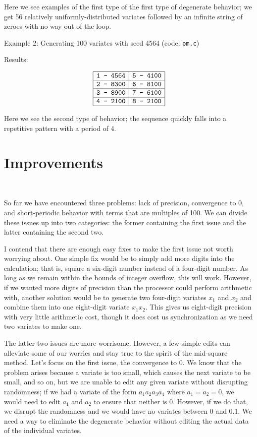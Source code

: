 \documentclass[11pt]{article}
\begin{document}
Here we see examples of the first type of the first type of degenerate behavior; we get 56 relatively uniformly-distributed variates followed by an infinite string of zeroes with no way out of the loop.

\vspace{1cm}

Example 2: Generating 100 variates with seed 4564 (code: \texttt{om.c})

Results:

$$\begin{array}{|c|c|}\hline
\texttt{1 - 4564} & \texttt{5 - 4100}\\\hline
\texttt{2 - 8300} & \texttt{6 - 8100}\\\hline
\texttt{3 - 8900} & \texttt{7 - 6100}\\\hline
\texttt{4 - 2100} & \texttt{8 - 2100}\\\hline
\end{array}$$

Here we see the second type of behavior; the sequence quickly falls into a repetitive pattern with a period of 4.

\newpage
\section{Improvements}

$ $

So far we have encountered three problems: lack of precision, convergence to 0, and short-periodic behavior with terms that are multiples of 100.  We can divide these issues up into two categories: the former containing the first issue and the latter containing the second two.

I contend that there are enough easy fixes to make the first issue not worth worrying about.  One simple fix would be to simply add more digits into the calculation; that is, square a six-digit number instead of a four-digit number.  As long as we remain within the bounds of integer overflow, this will work.  However, if we wanted more digits of precision than the processor could perform arithmetic with, another solution would be to generate two four-digit variates $x_1$ and $x_2$ and combine them into one eight-digit variate $x_1x_2$.  This gives us eight-digit precision with very little arithmetic cost, though it does cost us synchronization as we need two variates to make one.

The latter two issues are more worrisome.  However, a few simple edits can alleviate some of our worries and stay true to the spirit of the mid-square method.  Let's focus on the first issue, the convergence to 0.  We know that the problem arises because a variate is too small, which causes the next variate to be small, and so on, but we are unable to edit any given variate without disrupting randomness; if we had a variate of the form $a_1a_2a_3a_4$ where $a_1=a_2=0$, we would need to edit $a_1$ and $a_2$ to ensure that neither is 0.  However, if we do that, we disrupt the randomness and we would have no variates between 0 and 0.1.  We need a way to eliminate the degenerate behavior without editing the actual data of the individual variates.
\end{document}
